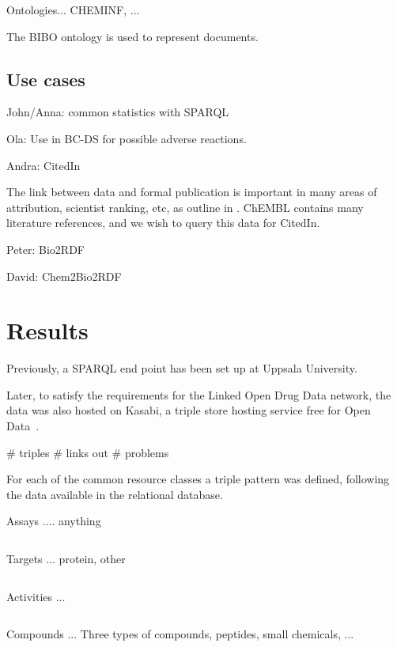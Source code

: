 \documentclass[sw]{iosart2c}
\begin{document}
Ontologies... CHEMINF, ...

The BIBO ontology is used to represent documents.

\subsection{Use cases}

John/Anna: common statistics with SPARQL

Ola: Use in BC-DS for possible adverse reactions.

Andra: CitedIn

The link between data and formal publication is important in many areas of
attribution, scientist ranking, etc, as outline in \cite{Waagmeester2012}.
ChEMBL contains many literature references, and we wish to query this data
for CitedIn.

Peter: Bio2RDF

David: Chem2Bio2RDF

\section{Results}\label{s3}

Previously, a SPARQL end point has been set up at Uppsala University.

Later, to satisfy the requirements for the Linked Open Drug Data \cite{}
network, the data was also hosted on Kasabi, a triple store hosting service
free for Open Data~\cite{}.

\# triples
\# links out
\# problems

For each of the common resource classes a triple pattern was defined, following the
data available in the relational database.

Assays .... anything

\begin{verbatim}
\end{verbatim}

Targets ... protein, other

\begin{verbatim}
\end{verbatim}

Activities ...

\begin{verbatim}
\end{verbatim}

Compounds ... Three types of compounds, peptides, small chemicals, ...
\end{document}
